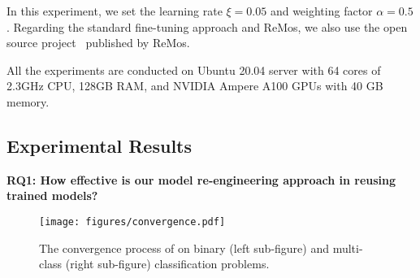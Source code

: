 In this experiment, we set the learning rate $\xi{=}0.05$ and weighting factor $\alpha{=}0.5$.
Regarding the standard fine-tuning approach and ReMos, we also use the open source project~\cite{remosproject} published by ReMos.

All the experiments are conducted on Ubuntu 20.04 server with 64 cores of 2.3GHz CPU, 128GB RAM, and NVIDIA Ampere A100 GPUs with 40 GB memory.

\subsection{Experimental Results}
\label{subsec:exp_result}
\noindent \textbf{RQ1: How effective is our model re-engineering approach in reusing trained models?}

\begin{figure}[!th]
    \centering
    \texttt{[image: figures/convergence.pdf]}
    \caption{The convergence process of \projectName on binary (left sub-figure) and multi-class (right sub-figure) classification problems. }
    \label{fig:convergence}
\end{figure}


